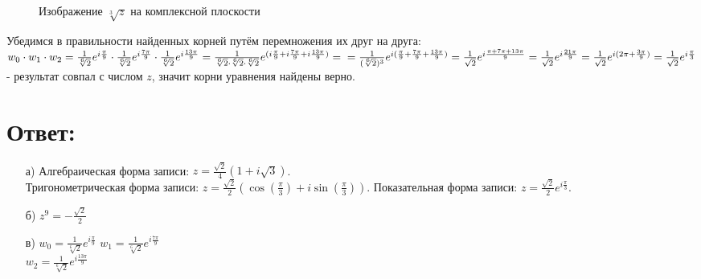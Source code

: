\documentclass[12pt, a4paper]{article}
\begin{document}
\begin{enumerate}
\begin{figure}[h]
                \caption{Изображение $\sqrt[3]{z}$ на комплексной плоскости}
            \end{figure}
            Убедимся в правильности найденных корней путём перемножения их
            друг на друга:\\
            \begin{math}
                w_0 \cdot w_1 \cdot w_2 = \frac{1}{\sqrt[6]{2}}e^{i\frac{\pi}{9}} \cdot
                \frac{1}{\sqrt[6]{2}}e^{i\frac{7\pi}{9}} \cdot
                \frac{1}{\sqrt[6]{2}}e^{i\frac{13\pi}{9}} = 
                \frac{1}{\sqrt[6]{2}\cdot\sqrt[6]{2}\cdot\sqrt[6]{2}}
                e^{(i\frac{\pi}{9} + i\frac{7\pi}{9} + i\frac{13\pi}{9})} = \\ =
                \frac{1}{(\sqrt[6]{2})^3}e^{i(\frac{\pi}{9} + \frac{7\pi}{9} + \frac{13\pi}{9})} = 
                \frac{1}{\sqrt{2}}e^{i\frac{\pi + 7\pi + 13\pi}{9}} = 
                \frac{1}{\sqrt{2}}e^{i\frac{21\pi}{9}} = 
                \frac{1}{\sqrt{2}}e^{i(2\pi + \frac{3\pi}{9})} = 
                \frac{1}{\sqrt{2}}e^{i\frac{\pi}{3}}
            \end{math}
            - результат совпал с числом $z$, значит корни уравнения найдены верно.      
    \end{enumerate}
    \section*{Ответ:}
    \begin{enumerate}
        \item [а)] 
        Алгебраическая форма записи: 
        $z = \frac{\sqrt{2}}{4}(1 + i\sqrt{3})$.\\
        Тригонометрическая форма записи: 
        $z = \frac{\sqrt{2}}{2}(\cos(\frac{\pi}{3}) + i\sin(\frac{\pi}{3}))$.\newline
        Показательная форма записи:
        $z = \frac{\sqrt{2}}{2}e^{i\frac{\pi}{3}}$.\\
        \item [б)] $z^9 = -\frac{\sqrt{2}}{2}$
        \item [в)] $w_0 = \frac{1}{\sqrt[6]{2}}e^{i\frac{\pi}{9}}$\newline
        $w_1 = \frac{1}{\sqrt[6]{2}}e^{i\frac{7\pi}{9}}$\\
        $w_2 = \frac{1}{\sqrt[6]{2}}e^{i\frac{13\pi}{9}}$\\
    \end{enumerate}
    \newpage
%
%
\end{document}
